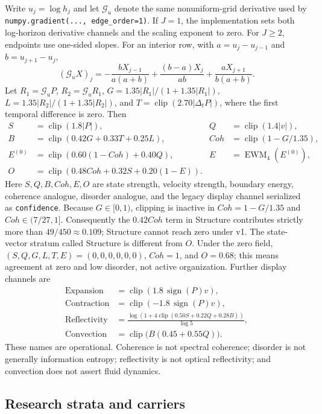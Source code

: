 \documentclass{article}
\newcommand{\pressure}{P}
\newcommand{\clip}{\operatorname{clip}}
\newcommand{\EWM}{\operatorname{EWM}}
\begin{document}
Write $u_j=\log h_j$ and let $\mathcal G_u$ denote the same nonuniform-grid derivative used by \texttt{numpy.gradient(..., edge\_order=1)}. If $J=1$, the implementation sets both log-horizon derivative channels and the scaling exponent to zero. For $J\ge2$, endpoints use one-sided slopes. For an interior row, with $a=u_j-u_{j-1}$ and $b=u_{j+1}-u_j$,
\begin{equation}
(\mathcal G_uX)_j=
-\frac{bX_{j-1}}{a(a+b)}+\frac{(b-a)X_j}{ab}
+\frac{aX_{j+1}}{b(a+b)}.
\label{eq:scale-stencil}
\end{equation}
Let $R_1=\mathcal G_u\pressure$, $R_2=\mathcal G_uR_1$,
$G=1.35|R_1|/(1+1.35|R_1|)$,
$L=1.35|R_2|/(1+1.35|R_2|)$, and
$T=\clip(2.70|\Delta_t\pressure|)$, where the first temporal difference is zero. Then
\begin{align}
S&=\clip(1.8|\pressure|), &
Q&=\clip(1.4|v|),\\
B&=\clip(0.42G+0.33T+0.25L),&
Coh&=\clip(1-G/1.35),\\
E^{(0)}&=\clip(0.60(1-Coh)+0.40Q),&
E&=\EWM_4(E^{(0)}),\\
O&=\clip(0.48Coh+0.32S+0.20(1-E)).
\end{align}
Here $S,Q,B,Coh,E,O$ are state strength, velocity strength, boundary energy, coherence analogue, disorder analogue, and the legacy display channel serialized as \texttt{confidence}. Because $G\in[0,1)$, clipping is inactive in $Coh=1-G/1.35$ and $Coh\in(7/27,1]$. Consequently the $0.42Coh$ term in Structure contributes strictly more than $49/450\approx0.109$; Structure cannot reach zero under v1. The state-vector stratum called Structure is different from $O$. Under the zero field, $(S,Q,G,L,T,E)=(0,0,0,0,0,0)$, $Coh=1$, and $O=0.68$; this means agreement at zero and low disorder, not active organization. Further display channels are
\begin{align}
\mathrm{Expansion}&=\clip(1.8\,\operatorname{sign}(\pressure)v),\\
\mathrm{Contraction}&=\clip(-1.8\,\operatorname{sign}(\pressure)v),\\
\mathrm{Reflectivity}&=
\frac{\log(1+4\clip(0.50S+0.22Q+0.28B))}{\log 5},\\
\mathrm{Convection}&=\clip\big(B(0.45+0.55Q)\big).
\end{align}
These names are operational. Coherence is not spectral coherence; disorder is not generally information entropy; reflectivity is not optical reflectivity; and convection does not assert fluid dynamics.

\subsection{Research strata and carriers}
\end{document}
